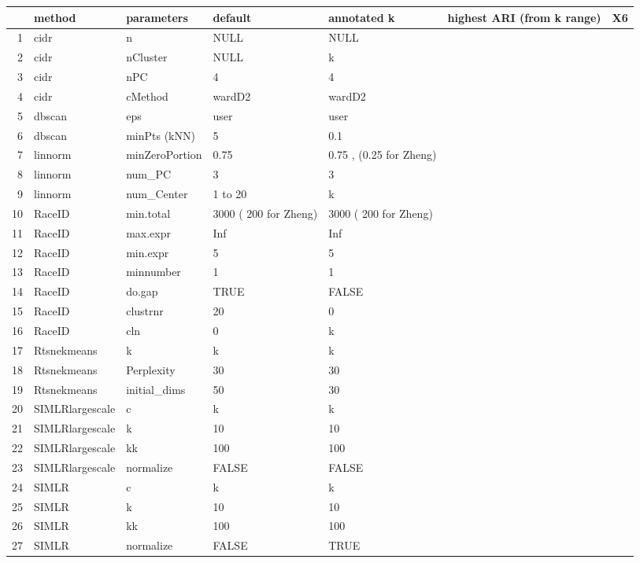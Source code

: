\documentclass[11pt, a4paper]{article}\usepackage[]{graphicx}\usepackage[]{color}
\begin{document}
\clearpage
\begin{table}[ht]
\centering
\begin{tabular}{rllllll}
  \hline
 & method & parameters & default & annotated k & highest ARI (from k range) & X6 \\ 
  \hline
1 & cidr & n & NULL & NULL &  &  \\ 
  2 & cidr & nCluster & NULL & k &  &  \\ 
  3 & cidr & nPC & 4 & 4 &  &  \\ 
  4 & cidr & cMethod & wardD2 & wardD2 &  &  \\ 
  5 & dbscan & eps & user & user &  &  \\ 
  6 & dbscan & minPts (kNN) & 5 & 0.1 &  &  \\ 
  7 & linnorm & minZeroPortion & 0.75 & 0.75 , (0.25 for Zheng) &  &  \\ 
  8 & linnorm & num\_PC & 3 & 3 &  &  \\ 
  9 & linnorm & num\_Center & 1 to 20 & k &  &  \\ 
  10 & RaceID & min.total & 3000 ( 200 for Zheng) & 3000 ( 200 for Zheng) &  &  \\ 
  11 & RaceID & max.expr & Inf & Inf &  &  \\ 
  12 & RaceID & min.expr & 5 & 5 &  &  \\ 
  13 & RaceID & minnumber & 1 & 1 &  &  \\ 
  14 & RaceID & do.gap & TRUE & FALSE &  &  \\ 
  15 & RaceID & clustrnr & 20 & 0 &  &  \\ 
  16 & RaceID & cln & 0 & k &  &  \\ 
  17 & Rtsnekmeans & k & k & k &  &  \\ 
  18 & Rtsnekmeans & Perplexity & 30 & 30 &  &  \\ 
  19 & Rtsnekmeans & initial\_dims & 50 & 30 &  &  \\ 
  20 & SIMLRlargescale & c & k & k &  &  \\ 
  21 & SIMLRlargescale & k & 10 & 10 &  &  \\ 
  22 & SIMLRlargescale & kk & 100 & 100 &  &  \\ 
  23 & SIMLRlargescale & normalize & FALSE & FALSE &  &  \\ 
  24 & SIMLR & c & k & k &  &  \\ 
  25 & SIMLR & k & 10 & 10 &  &  \\ 
  26 & SIMLR & kk & 100 & 100 &  &  \\ 
  27 & SIMLR & normalize & FALSE & TRUE &  &  \\ 

\end{tabular}
\end{table}
\end{document}
